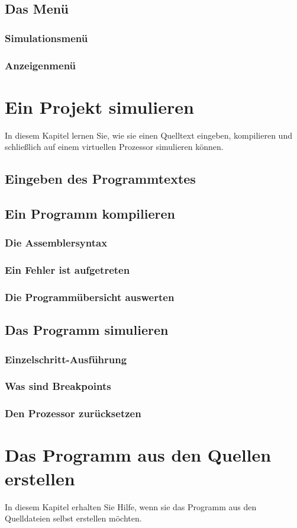 \documentclass[11pt,a4paper]{hsfuldabook}
\begin{document}
\section{Das Menü}
\subsection{Simulationsmenü}

\subsection{Anzeigenmenü}

\chapter {Ein Projekt simulieren}
In diesem Kapitel lernen Sie, wie sie einen Quelltext eingeben, kompilieren und schließlich auf einem
virtuellen Prozessor simulieren können.

\section{Eingeben des Programmtextes}

\section{Ein Programm kompilieren}

\subsection{Die Assemblersyntax}

\subsection{Ein Fehler ist aufgetreten}

\subsection{Die Programmübersicht auswerten}

\section{Das Programm simulieren}

\subsection{Einzelschritt-Ausführung}
\subsection{Was sind Breakpoints}
\subsection{Den Prozessor zurücksetzen}

\chapter{Das Programm aus den Quellen erstellen}
In diesem Kapitel erhalten Sie Hilfe, wenn sie das Programm aus den Quelldateien selbst erstellen möchten.
\end{document}
